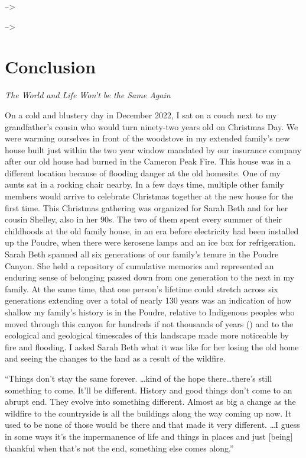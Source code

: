 \documentclass[
]{article}
\begin{document}
\clearpage

--\textgreater{}

--\textgreater{}

\section{Conclusion}\label{conclusion}

\emph{The World and Life Won't be the Same Again}

On a cold and blustery day in December 2022, I sat on a couch next to my grandfather's cousin who would turn ninety-two years old on Christmas Day. We were warming ourselves in front of the woodstove in my extended family's new house built just within the two year window mandated by our insurance company after our old house had burned in the Cameron Peak Fire. This house was in a different location because of flooding danger at the old homesite. One of my aunts sat in a rocking chair nearby. In a few days time, multiple other family members would arrive to celebrate Christmas together at the new house for the first time. This Christmas gathering was organized for Sarah Beth and for her cousin Shelley, also in her 90s. The two of them spent every summer of their childhoods at the old family house, in an era before electricity had been installed up the Poudre, when there were kerosene lamps and an ice box for refrigeration. Sarah Beth spanned all six generations of our family's tenure in the Poudre Canyon. She held a repository of cumulative memories and represented an enduring sense of belonging passed down from one generation to the next in my family. At the same time, that one person's lifetime could stretch across six generations extending over a total of nearly 130 years was an indication of how shallow my family's history is in the Poudre, relative to Indigenous peoples who moved through this canyon for hundreds if not thousands of years () and to the ecological and geological timescales of this landscape made more noticeable by fire and flooding. I asked Sarah Beth what it was like for her losing the old home and seeing the changes to the land as a result of the wildfire.

``Things don't stay the same forever. \ldots kind of the hope there\ldots there's still something to come. It'll be different. History and good things don't come to an abrupt end. They evolve into something different. Almost as big a change as the wildfire to the countryside is all the buildings along the way coming up now. It used to be none of those would be there and that made it very different. \ldots I guess in some ways it's the impermanence of life and things in places and just {[}being{]} thankful when that's not the end, something else comes along.''
\end{document}
